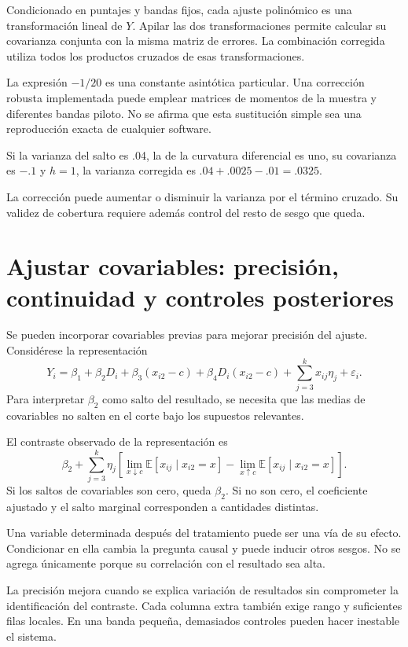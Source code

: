 \documentclass[11pt,a4paper]{article}
\newcommand{\E}{\mathbb E}
\begin{document}
Condicionado en puntajes y bandas fijos,
cada ajuste polinómico es una
transformación lineal de \(Y\).
Apilar las dos transformaciones permite
calcular su covarianza conjunta
con la misma matriz de errores.
La combinación corregida utiliza
todos los productos cruzados de esas transformaciones.

La expresión \(-1/20\) es una constante
asintótica particular.
Una corrección robusta implementada
puede emplear matrices de momentos
de la muestra y diferentes bandas piloto.
No se afirma que esta sustitución simple
sea una reproducción exacta de cualquier software.

\begin{ejemplo}
Si la varianza del salto es .04,
la de la curvatura diferencial es uno,
su covarianza es \(-.1\) y \(h=1\),
la varianza corregida es
\(.04+.0025-.01=.0325\).
\end{ejemplo}
La corrección puede aumentar o disminuir
la varianza por el término cruzado.
Su validez de cobertura requiere además
control del resto de sesgo que queda.

\clearpage
\section{Ajustar covariables: precisión, continuidad y controles posteriores}\label{unidad38}
Se pueden incorporar covariables previas
para mejorar precisión del ajuste.
Considérese la representación
\[
Y_i=\beta_1+\beta_2D_i+\beta_3(x_{i2}-c)
+\beta_4D_i(x_{i2}-c)+\sum_{j=3}^k x_{ij}\eta_j+\varepsilon_i.
\]
Para interpretar \(\beta_2\) como salto
del resultado, se necesita que las
medias de covariables no salten en el corte
bajo los supuestos relevantes.

El contraste observado de la representación es
\[
\beta_2+\sum_{j=3}^k\eta_j\left[
\lim_{x\downarrow c}\E[x_{ij}\mid x_{i2}=x]
-\lim_{x\uparrow c}\E[x_{ij}\mid x_{i2}=x]\right].
\]
Si los saltos de covariables son cero,
queda \(\beta_2\).
Si no son cero, el coeficiente ajustado
y el salto marginal corresponden
a cantidades distintas.

Una variable determinada después del tratamiento
puede ser una vía de su efecto.
Condicionar en ella cambia la pregunta causal
y puede inducir otros sesgos.
No se agrega únicamente porque
su correlación con el resultado sea alta.

La precisión mejora cuando se explica
variación de resultados sin comprometer
la identificación del contraste.
Cada columna extra también exige
rango y suficientes filas locales.
En una banda pequeña, demasiados controles
pueden hacer inestable el sistema.
\end{document}
